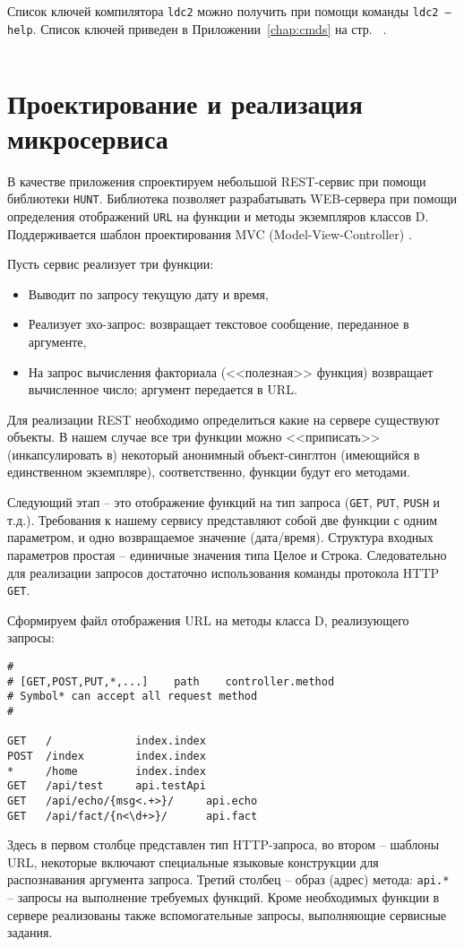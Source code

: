 \documentclass{studrep}
\begin{document}
Список ключей компилятора \texttt{ldc2} можно получить при помощи команды \texttt{ldc2 --help}. Список ключей приведен в Приложении~\ref{chap:cmds} на стр.
~\pageref{chap:cmds}.

\begin{verbatim}

\end{verbatim}

\chapter{Проектирование и реализация микросервиса}

В качестве приложения спроектируем небольшой REST-сервис при помощи библиотеки \texttt{HUNT}.  Библиотека позволяет разрабатывать WEB-сервера при помощи определения отображений \texttt{URL} на функции и методы экземпляров классов D.  Поддерживается шаблон проектирования MVC (Model-View-Controller) \cite{mvc}.

Пусть сервис реализует три функции:
\begin{itemize}
\item Выводит по запросу текущую дату и время,
\item Реализует эхо-запрос: возвращает текстовое сообщение, переданное в аргументе,
\item На запрос вычисления факториала (<<полезная>> функция) возвращает вычисленное число; аргумент передается в URL.
\end{itemize}

Для реализации REST необходимо определиться какие на сервере существуют объекты.  В нашем случае все три функции можно <<приписать>> (инкапсулировать в) некоторый анонимный объект-синглтон (имеющийся в единственном экземпляре), соответственно, функции будут его методами.

Следующий этап -- это отображение функций на тип запроса (\texttt{GET}, \texttt{PUT}, \texttt{PUSH} и т.д.).  Требования к нашему сервису представляют собой две функции с одним параметром, и одно возвращаемое значение (дата/время).  Структура входных параметров простая -- единичные значения типа Целое и Строка.  Следовательно для реализации запросов достаточно использования команды протокола HTTP \texttt{GET}.


Сформируем файл отображения URL на методы класса D, реализующего запросы:
\begin{verbatim}
#
# [GET,POST,PUT,*,...]    path    controller.method
# Symbol* can accept all request method
#

GET   /             index.index
POST  /index        index.index
*     /home         index.index
GET   /api/test     api.testApi
GET   /api/echo/{msg<.+>}/     api.echo
GET   /api/fact/{n<\d+>}/      api.fact
\end{verbatim}
Здесь в первом столбце представлен тип HTTP-запроса, во втором -- шаблоны URL, некоторые включают специальные языковые конструкции для распознавания аргумента запроса. Третий столбец -- образ (адрес) метода: \texttt{api.*} -- запросы на выполнение требуемых функций.  Кроме необходимых функции в сервере реализованы также вспомогательные запросы, выполняющие сервисные задания.
\end{document}
